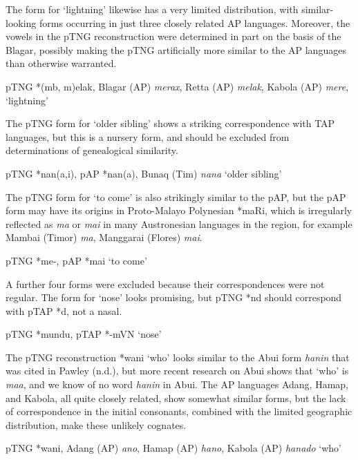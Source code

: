 The form for `lightning' likewise has a very limited distribution, with similar-looking forms occurring in just three closely related AP languages. Moreover, the vowels in the pTNG reconstruction were determined in part on the basis of the Blagar, possibly making the pTNG artificially more similar to the AP languages than otherwise warranted.

\ea%
\label{ex:4:49}
\upshape    pTNG *(mb, m)elak, Blagar (AP) \textit{merax}, Retta (AP) \textit{melak}, Kabola (AP) \textit{mere}\textit{{\textglotstop}}, `lightning'  
\z

The pTNG form for `older sibling' shows a striking correspondence with TAP languages, but this is a nursery form, and should be excluded from determinations of genealogical similarity.

\ea%
\label{ex:4:50}
\upshape    pTNG *nan(a,i), pAP *nan(a), Bunaq (Tim) \textit{nana} `older sibling'  
\z

The pTNG form for `to come' is also strikingly similar to the pAP, but the pAP form may have its origins in Proto-Malayo Polynesian *maRi, which is irregularly reflected as \textit{ma }or \textit{mai }in many Austronesian languages in the region, for example Mambai (Timor) \textit{ma}, Manggarai (Flores) \textit{mai}.

\ea%
\label{ex:4:51}
\upshape    pTNG *me-, pAP *mai `to come'  
\z

A further four forms were excluded because their correspondences were not regular. The form for `nose' looks promising, but pTNG *nd should correspond with pTAP *d, not a nasal.

\ea%
\label{ex:4:52}
\upshape    pTNG *mundu, pTAP *-mVN `nose'   
\z

The pTNG reconstruction *wani `who' looks similar to the Abui form \textit{hanin} that was cited in Pawley (n.d.), but more recent research on Abui shows that `who' is \textit{maa}, and we know of  no word \textit{hanin} in Abui. The AP languages Adang, Hamap, and Kabola, all quite closely related, show somewhat similar forms, but the lack of correspondence in the initial consonants, combined with the limited geographic distribution, make these unlikely cognates.

\ea%
\label{ex:4:53}
\upshape    pTNG *wani, Adang (AP) \textit{ano}, Hamap (AP) \textit{hano}, Kabola (AP) \textit{hanado} `who' 
\z

